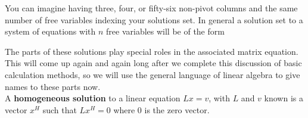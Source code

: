 

\begin{center}
{}
\end{center}

You can imagine having three, four, or fifty-six non-pivot columns and the same number of free variables indexing your solutions set. 
In general a solution set to a system of equations with $n$ free variables will be of the form 
\begin{center}
\end{center}

The parts of these solutions play special roles in the associated matrix equation. This will come up again and again long after we complete this discussion of basic calculation methods, so we will use the general language of linear algebra to give names to these parts now. \\

 A {\bf homogeneous solution} to a linear equation $Lx=v$, with $L$ and $v$ known is a vector $x^H $ such  that $Lx^H =0$ where $0$ is the zero vector. \\

\\



\begin{center}
\end{center}



